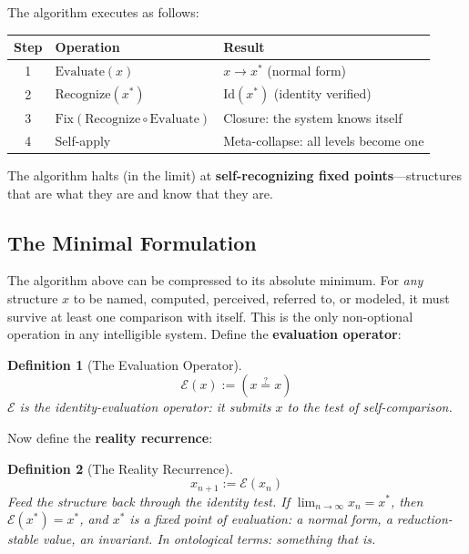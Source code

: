\documentclass[12pt, letterpaper]{book}
\def\equiv{=}%
\newtheorem{definition}{Definition}[chapter]
\begin{document}
The algorithm executes as follows:

\begin{center}
\small
\begin{tabular}{cl p{6.5cm}}
\toprule
\textbf{Step} & \textbf{Operation} & \textbf{Result} \\
\midrule
1 & $\mathrm{Evaluate}(x)$ & $x \to x^*$ (normal form) \\
2 & $\mathrm{Recognize}(x^*)$ & $\mathrm{Id}(x^*)$ (identity verified) \\
3 & $\mathrm{Fix}(\mathrm{Recognize} \circ \mathrm{Evaluate})$ & Closure: the system knows itself \\
4 & Self-apply & Meta-collapse: all levels become one \\
\bottomrule
\end{tabular}
\end{center}

The algorithm halts (in the limit) at \textbf{self-recognizing fixed points}---structures that are what they are and know that they are.

\subsection{The Minimal Formulation}

The algorithm above can be compressed to its absolute minimum. For \textit{any} structure $x$ to be named, computed, perceived, referred to, or modeled, it must survive at least one comparison with itself. This is the only non-optional operation in any intelligible system. Define the \textbf{evaluation operator}:

\begin{definition}[The Evaluation Operator]\label{def:eval-operator}
\[
\mathcal{E}(x) := (x \stackrel{?}{\equiv} x)
\]
$\mathcal{E}$ is the identity-evaluation operator: it submits $x$ to the test of self-comparison.
\end{definition}

Now define the \textbf{reality recurrence}:

\begin{definition}[The Reality Recurrence]\label{def:reality-recurrence}
\[
x_{n+1} := \mathcal{E}(x_n)
\]
Feed the structure back through the identity test. If $\displaystyle\lim_{n \to \infty} x_n = x^*$, then $\mathcal{E}(x^*) = x^*$, and $x^*$ is a fixed point of evaluation: a normal form, a reduction-stable value, an invariant. In ontological terms: \textit{something that is}.
\end{definition}
\end{document}
